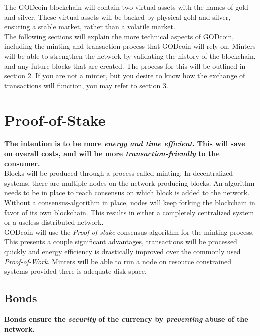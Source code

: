 \documentclass[12pt,a4paper]{article}
\begin{document}
  The GODcoin blockchain will contain two virtual assets with the names of gold
  and silver. These virtual assets will be backed by physical gold and silver,
  ensuring a stable market, rather than a volatile market.\\

  The following sections will explain the more technical aspects of GODcoin,
  including the minting and transaction process that GODcoin will rely on.
  Minters will be able to strengthen the network by validating the history of
  the \gls{blockchain}, and any future blocks that are created. The process for
  this will be outlined in \underline{\hyperref[sec:PoS]{section 2}}. If you are
  not a minter, but you desire to know how the exchange of transactions will
  function, you may refer to \underline{\hyperref[sec:Transactions]{section 3}}.

  \section{Proof-of-Stake}\label{sec:PoS}
  \textbf{The intention is to be more \textit{energy and time efficient}. This
  will save on overall costs, and will be more \textit{transaction-friendly} to
  the consumer.}\\

  Blocks will be produced through a process called minting. In
  \glspl{decentralized-system}, there are multiple \glspl{node} on the
  \gls{network} producing blocks. An algorithm needs to be in place to reach
  consensus on which block is added to the network. Without a
  \gls{consensus-algorithm} in place, nodes will keep forking the blockchain in
  favor of its own blockchain. This results in either a completely centralized
  system or a useless distributed network.\\

  GODcoin will use the \textit{Proof-of-stake} consensus algorithm for the
  minting process. This presents a couple significant advantages, transactions
  will be processed quickly and energy efficiency is drastically improved over
  the commonly used \textit{Proof-of-Work}. Minters will be able to run a node
  on resource constrained systems provided there is adequate disk space.

  \subsection{Bonds}
  \textbf{Bonds ensure the \textit{security} of the currency by
  \textit{preventing} abuse of the network.}\\
\end{document}
